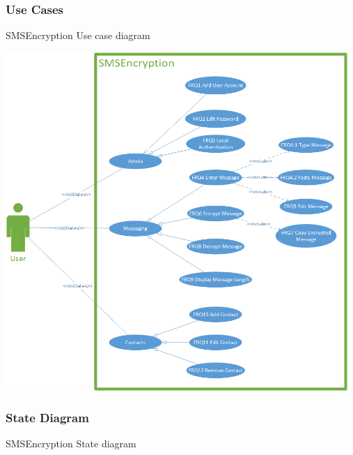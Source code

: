 \newpage
\subsubsection{Use Cases}
SMSEncryption Use case diagram

\begin{center}
 \includegraphics[width=13cm]{diagrams/UseCaseDiagrams/UsecaseV4.png}
\end{center}

\newpage
\subsubsection{State Diagram}
SMSEncryption State diagram

